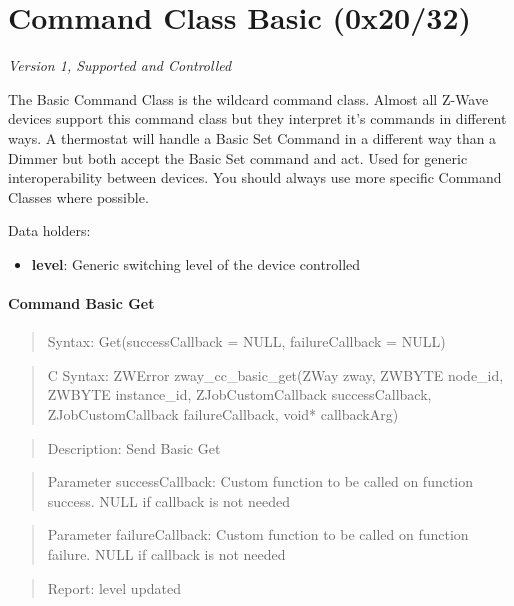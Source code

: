 

\section{Command Class Basic (0x20/32)}

\textit{Version 1, Supported and Controlled}
\newline

The Basic Command Class is the wildcard command class. Almost all Z-Wave devices support this command class but they interpret it's commands in different ways. A thermostat will handle a Basic Set Command in a different way than a Dimmer but both accept the Basic Set command and act. Used for generic interoperability between devices. You should always use more specific Command Classes where possible.
\newline

\noindent
Data holders:

\begin{itemize}
\item \textbf{level}: Generic switching level of the device controlled
\end{itemize}

\paragraph{Command Basic Get}
\begin{quote}Syntax: Get(successCallback = NULL, failureCallback = NULL)\end{quote}
\begin{quote}C Syntax: ZWError zway\_cc\_basic\_get(ZWay zway, ZWBYTE node\_id, ZWBYTE instance\_id, ZJobCustomCallback successCallback, ZJobCustomCallback failureCallback, void* callbackArg)\end{quote}
\begin{quote}Description: Send Basic Get\end{quote}
\begin{quote}Parameter successCallback: Custom function to be called on function success. NULL if callback is not needed\end{quote}
\begin{quote}Parameter failureCallback: Custom function to be called on function failure. NULL if callback is not needed\end{quote}
\begin{quote}Report: level updated\end{quote}

